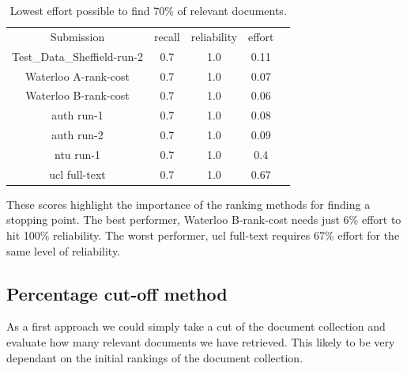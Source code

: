 \begin{table}[H]

\centering
\begin{tabular}{|c|c|c|c|c|} 
\hline
 Submission & recall & reliability & effort  \\ 
 Test\_Data\_Sheffield-run-2 & 0.7 &	1.0	&	0.11 \\ 
 Waterloo A-rank-cost & 0.7 &	1.0	&	0.07 \\ 
 Waterloo B-rank-cost & 0.7 &	1.0	&	0.06 \\ 
 auth run-1 & 0.7 &	1.0	&	0.08 \\ 
 auth run-2 & 0.7 &	1.0	&	0.09 \\ 
 ntu run-1 & 0.7 &	1.0	&	0.4 \\ 
 ucl full-text & 0.7 &	1.0	&	0.67 \\ 
 \hline
\end{tabular}

\caption{Lowest effort possible to find 70\% of relevant documents. }

\end{table}

These scores highlight the importance of the ranking methods for finding a stopping point. The best performer, Waterloo B-rank-cost needs just 6\% effort to hit 100\% reliability. The worst performer, ucl full-text requires 67\% effort for the same level of reliability.


\subsection{Percentage cut-off method} \label{perCutOffMethod}

As a first approach we could simply take a cut of the document collection and evaluate how many relevant documents we have retrieved. This likely to be very dependant on the initial rankings of the document collection. 

